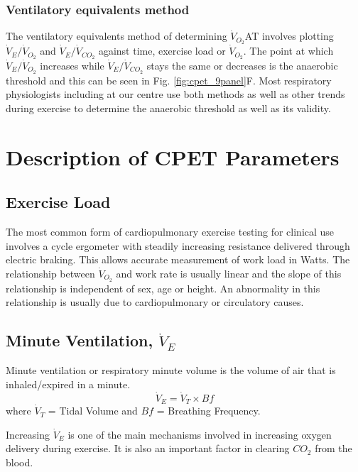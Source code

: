 \subsubsection{Ventilatory equivalents method}
The ventilatory equivalents method of determining $\dot{V}_{O_2}$AT involves plotting $\dot{V}_E/\dot{V}_{O_2}$
and $\dot{V}_E/\dot{V}_{CO_2}$ against time, exercise load or $\dot{V}_{O_2}$. The point at which $\dot{V}_E/\dot{V}_{O_2}$ increases while $\dot{V}_E/\dot{V}_{CO_2}$ stays the same or decreases is the anaerobic threshold and this can be seen in Fig. \ref{fig:cpet_9panel}F. Most respiratory physiologists including at our centre use both methods as well as other trends during exercise to determine the anaerobic threshold as well as its validity.


\section{Description of CPET Parameters}
\label{sec:cpx_parameters}


\subsection{Exercise Load}
The most common form of cardiopulmonary exercise testing for clinical use involves a cycle ergometer with steadily increasing resistance delivered through electric braking. This allows accurate measurement of work load in Watts. The relationship between $\dot{V}_{O_2}$ and work rate is usually linear and the slope of this relationship is independent of sex, age or height. An abnormality in this relationship is usually due to cardiopulmonary or circulatory causes.

\subsection{Minute Ventilation, $\dot{V}_E$}
Minute ventilation or respiratory minute volume is the volume of air that is inhaled/expired in a minute.
\begin{equation} \label{eq:VE=VTxBf}
	\dot{V}_E = \dot{V}_T \times Bf
\end{equation}
where $\dot{V}_T$ = Tidal Volume and $Bf$ = Breathing Frequency.

Increasing $\dot{V}_E$ is one of the main mechanisms involved in increasing oxygen delivery during exercise. It is also an important factor in clearing $CO_2$ from the blood.

